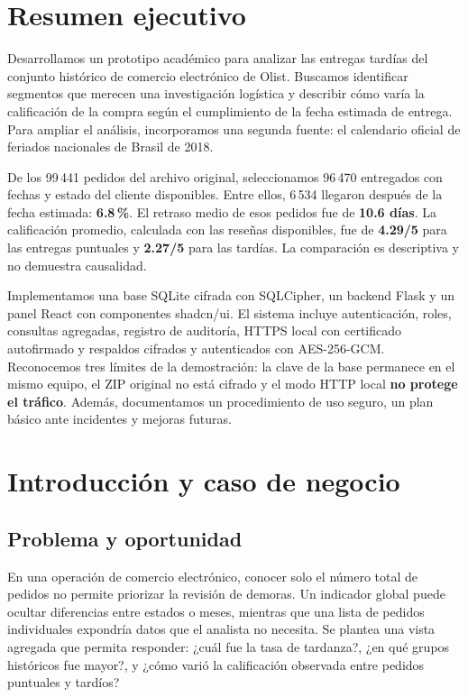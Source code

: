 \documentclass[12pt,a4paper]{article}
\begin{document}
\section{Resumen ejecutivo}
Desarrollamos un prototipo académico para analizar las entregas tardías del conjunto histórico de comercio electrónico de Olist. Buscamos identificar segmentos que merecen una investigación logística y describir cómo varía la calificación de la compra según el cumplimiento de la fecha estimada de entrega. Para ampliar el análisis, incorporamos una segunda fuente: el calendario oficial de feriados nacionales de Brasil de 2018.

De los 99\,441 pedidos del archivo original, seleccionamos 96\,470 entregados con fechas y estado del cliente disponibles. Entre ellos, 6\,534 llegaron después de la fecha estimada: \textbf{6.8\,\%}. El retraso medio de esos pedidos fue de \textbf{10.6 días}. La calificación promedio, calculada con las reseñas disponibles, fue de \textbf{4.29/5} para las entregas puntuales y \textbf{2.27/5} para las tardías. La comparación es descriptiva y no demuestra causalidad.

Implementamos una base SQLite cifrada con SQLCipher, un backend Flask y un panel React con componentes shadcn/ui. El sistema incluye autenticación, roles, consultas agregadas, registro de auditoría, HTTPS local con certificado autofirmado y respaldos cifrados y autenticados con AES-256-GCM. Reconocemos tres límites de la demostración: la clave de la base permanece en el mismo equipo, el ZIP original no está cifrado y el modo HTTP local \textbf{no protege el tráfico}. Además, documentamos un procedimiento de uso seguro, un plan básico ante incidentes y mejoras futuras.

\section{Introducción y caso de negocio}
\subsection{Problema y oportunidad}
En una operación de comercio electrónico, conocer solo el número total de pedidos no permite priorizar la revisión de demoras. Un indicador global puede ocultar diferencias entre estados o meses, mientras que una lista de pedidos individuales expondría datos que el analista no necesita. Se plantea una vista agregada que permita responder: ¿cuál fue la tasa de tardanza?, ¿en qué grupos históricos fue mayor?, y ¿cómo varió la calificación observada entre pedidos puntuales y tardíos?
\end{document}
